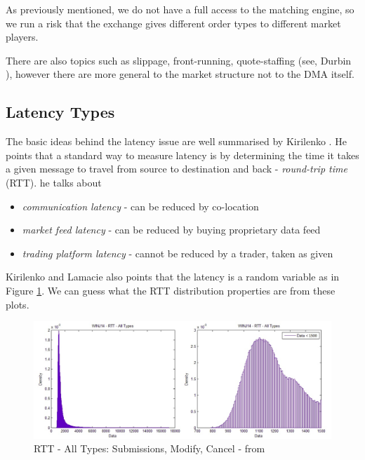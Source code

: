 \documentclass[12pt]{article}
\begin{document}
As previously mentioned, we do not have a full access to the matching engine, so we run a risk that the exchange gives different order types to different market players.

There are also topics such as slippage, front-running, quote-staffing (see, Durbin \cite{durbin}), however there are more general to the market structure not to the DMA itself.
\subsection*{Latency Types}
The basic ideas behind the latency issue are well summarised by Kirilenko \cite{kirli1}. He points that a standard way to measure latency is by determining the time it takes a given message to travel from source to destination and back - \textit{round-trip time} (RTT). he talks about
\begin{itemize}
\item \textit{communication latency} - can be reduced by co-location
\item \textit{market feed latency} - can be reduced by buying proprietary data feed
\item \textit{trading platform latency} - cannot be reduced by a trader, taken as given
\end{itemize}
Kirilenko and Lamacie \cite{kirli2} also points that the latency is a random variable as in Figure \ref{fig:latency}. We can guess what the RTT distribution properties are from these plots.

\begin{figure}[h!]
	\centering
    \includegraphics[scale=0.27]{latency.png}
    \caption{RTT - All Types: Submissions, Modify, Cancel - from \cite{kirli2}}
    \label{fig:latency}
\end{figure}
\FloatBarrier
\end{document}
